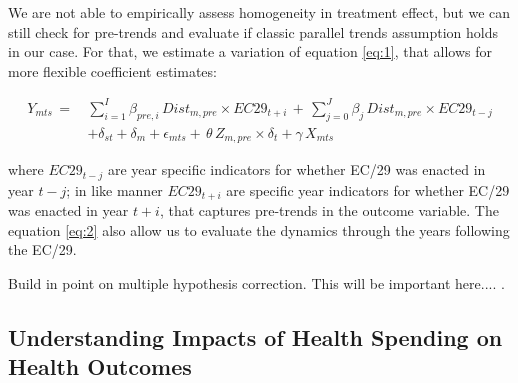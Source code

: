 We are not able to empirically assess homogeneity in treatment effect, but we can still check for pre-trends and evaluate if classic parallel trends assumption holds in our case. For that, we estimate a variation of equation \ref{eq:1}, that allows for more flexible coefficient estimates:

\begin{equation} \label{eq:2}
\begin{aligned}
    Y_{mts} \, =  \, & \sum\limits_{i=1}^I \beta_{pre,i} \, Dist_{m,pre} \times EC29_{t+i} \, + \, \sum\limits_{j=0}^J \beta_{j} \, Dist_{m,pre} \times EC29_{t-j} \\  
             & +  \delta_{st} + \delta_m + \epsilon_{mts} + \, \theta \, Z_{m,pre} \times \delta_{t} + \gamma \, X_{mts}
\end{aligned}
\end{equation}

where $EC29_{t-j}$ are year specific indicators for whether EC/29 was enacted in year $t-j$; in like manner $EC29_{t+i}$ are specific year indicators for whether EC/29 was enacted in year $t+i$, that captures pre-trends in the outcome variable. The equation \ref{eq:2} also allow us to evaluate the dynamics through the years following the EC/29. 

Build in point on multiple hypothesis correction.  This will be important here....  \citet{RomanoWolf2005,Anderson2008}.


\subsection{Understanding Impacts of Health Spending on Health Outcomes}




